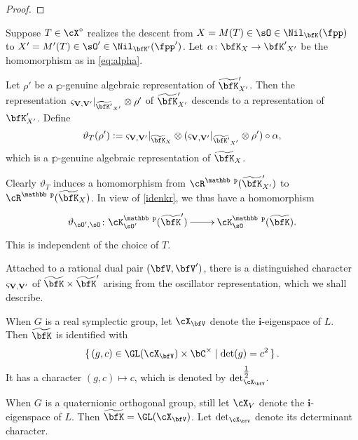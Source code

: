 \documentclass[12pt,a4paper]{amsart}
\newcommand{\wt}{\widetilde}
\numberwithin{equation}{section}
\theoremstyle{remark}
\def\wtbfK{\widetilde{\bfK}}
\def\half{{\tfrac{1}{2}}}
\def\MMP{M}
\def\Xo{\cX^\circ}
\def\dliftv{\vartheta}
\def\mktvvp{\varsigma_{{\bf V},{\bf V}'}}
\begin{document}
\begin{proof}

\end{proof}

  Suppose $T\in \Xo$ realizes the descent from  $X = \MMP(T)\in \sO\in \Nil_{\bfK}(\fpp)$
  to
  $X' = \MMP'(T)\in \sO'\in \Nil_{\bfK'}(\fpp')$. Let  $\alpha\colon
  {\bfK}_X\rightarrow {\bfK'}_{X'}$ be the homomorphism as in \cref{eq:alpha}.

  Let $\rho'$ be a $\mathbb p$-genuine algebraic representation  of $\wtbfK'_{X'}$. Then  the representation $\mktvvp|_{\wt{\bfK'}_{X'}}\otimes \rho'$ of $\wtbfK'_{X'}$ descends  to a representation of $\bfK'_{X'}$.  Define
  \begin{equation}\label{defn:tlift.rho}
    \dliftv_{T}(\rho'):= \mktvvp|_{\wt{\bfK}_{X}} \otimes (\mktvvp|_{\wt{\bfK'}_{X'}}\otimes \rho')\circ \alpha,
  \end{equation}
  which  is a $\mathbb p$-genuine algebraic representation of $\wt{\bfK}_{X}$.

  Clearly $\dliftv_T$ induces a homomorphism from
  $\cR^{\mathbb p}(\wtbfK'_{X'})$ to $\cR^{\mathbb p}(\wtbfK_X)$.
  In view of \eqref{idenkr}, we thus have a homomorphism
  \begin{equation}\label{defn:DS.ch}
    \xymatrix{
      \dliftv_{\sO',\sO}\colon \cK^{\mathbb p}_{\sO'}(\wt{\bfK}') \ar[r]&
      \cK^{\mathbb p}_{\sO}(\wt{\bfK}).
    }
  \end{equation}
  This is independent of the choice of $T$.



 Attached to a rational dual pair $(\bfV,\bfV')$, there is a distinguished character
  $\mktvvp$ of
  $\wtbfK\times\wtbfK'$ arising from the oscillator
  representation, which we shall describe.

  When $G$ is a real symplectic group, let $\cX_{\bfV}$ denote the $\mathbf i$-eigenspace of
  $L$. Then $\wtbfK$ is identified with \[
    \set{(g,c)\in \GL(\cX_{\bfV})\times
      \bC^\times|\det(g) = c^2}.\]
  It has a %
  character
  $ (g,c)\mapsto c$, which is denoted by $\det_{\cX_{\bfV}}^{\half}$. %


  When $G$ is a quaternionic orthogonal group, still let
  $\cX_V$ denote the $\mathbf i$-eigenspace of $L$. Then $\wtbfK = \GL(\cX_{\bfV})$. Let $\det_{\cX_{\bfV}}$ denote its determinant character.
\end{document}
